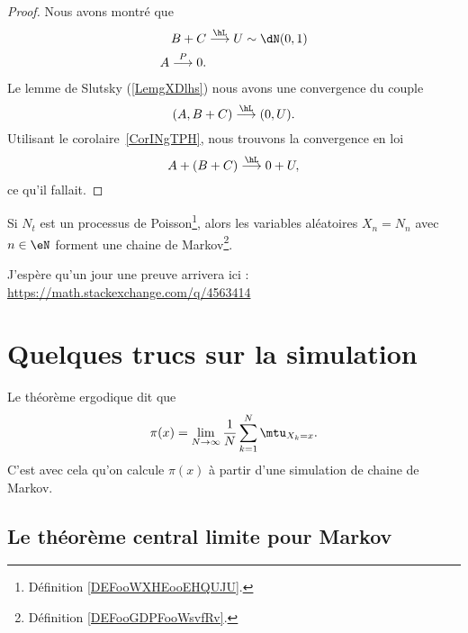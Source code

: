 \begin{proof}
	Nous avons montré que
	\begin{subequations}
		\begin{align}
			B+C & \stackrel{\hL}{\longrightarrow} U\sim\dN(0,1) \\
			A\stackrel{P}{\longrightarrow}0.
		\end{align}
	\end{subequations}
	Le lemme de Slutsky (\ref{LemgXDlhs}) nous avons une convergence du couple
	\begin{equation}
		(A,B+C)\stackrel{\hL}{\longrightarrow}(0,U).
	\end{equation}
	Utilisant le corolaire~\ref{CorINgTPH}, nous trouvons la convergence en loi
	\begin{equation}
		A+(B+C)\stackrel{\hL}{\longrightarrow}0+U,
	\end{equation}
	ce qu'il fallait.
\end{proof}

\begin{proposition}     \label{PROPooWAVPooHDVsER}
    Si \( N_t\) est un processus de Poisson\footnote{Définition \ref{DEFooWXHEooEHQUJU}.}, alors les variables aléatoires \( X_n=N_n\) avec \( n\in \eN\) forment une chaine de Markov\footnote{Définition \ref{DEFooGDPFooWsvfRv}.}.
\end{proposition}
J'espère qu'un jour une preuve arrivera ici : \url{https://math.stackexchange.com/q/4563414}

\section{Quelques trucs sur la simulation}

Le théorème ergodique dit que
\begin{equation}
	\pi(x)=\lim_{N\to \infty} \frac{1}{ N }\sum_{k=1}^N\mtu_{X_k=x}.
\end{equation}
C'est avec cela qu'on calcule \( \pi(x)\) à partir d'une simulation de chaine de Markov.

\subsection{Le théorème central limite pour Markov}

